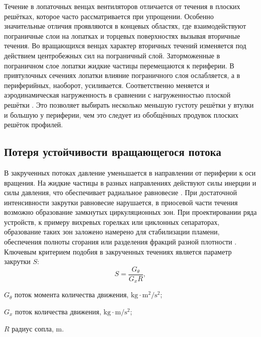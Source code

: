Течение в лопаточных венцах вентиляторов отличается от течения в плоских решётках, которое часто рассматривается при упрощении. Особенно значительные отличия проявляются в концевых областях, где взаимодействуют пограничные слои на лопатках и торцевых поверхностях вызывая вторичные течения. 
Во вращающихся венцах характер вторичных течений изменяется под действием центробежных сил на пограничный слой. Заторможенные в пограничном слое лопатки жидкие частицы перемещаются к периферии. В привтулочных сечениях лопатки влияние пограничного слоя ослабляется, а в периферийных, наоборот, усиливается. Соответственно меняется и аэродинамическая нагруженность в сравнении с нагруженностью плоской решётки \cite{Brusilovskiy1986}. Это позволяет выбирать несколько меньшую густоту решётки у втулки и большую у периферии, чем это следует из обобщённых продувок плоских решёток профилей.

\subsection{Потеря устойчивости вращающегося потока}\label{ch1/sec6}

В закрученных потоках давление уменьшается в направлении от периферии к оси вращения. На жидкие частицы в разных направлениях действуют силы инерции и силы давления, что обеспечивает радиальное равновесие \cite{Smith1966}. При достаточной интенсивности закрутки равновесие нарушается, в приосевой части течения возможно образование замкнутых циркуляционных зон. При проектировании ряда устройств, к примеру вихревых горелках или циклонных сепараторах, образование таких зон заложено намерено для стабилизации пламени, обеспечения полноты сгорания или разделения фракций разной плотности \cite{Gupta1987, Goldschtik1981}.
Ключевым критерием подобия в закрученных течениях является параметр закрутки \(S\):
\begin{equation}
	S = \frac{G_\theta}{G_x R},
	\label{eq:S}
\end{equation}
\begin{eqexpl}
	\item{\(G_\theta\)} поток момента количества движения, \(\si\kilogram\cdot\si\meter^2/\si\second^2\);
	\item{\(G_x\)} поток количества движения, \(\si\kilogram\cdot\si\meter/\si\second^2\);
	\item{\(R\)} радиус сопла, \(\si\meter\).
\end{eqexpl}

